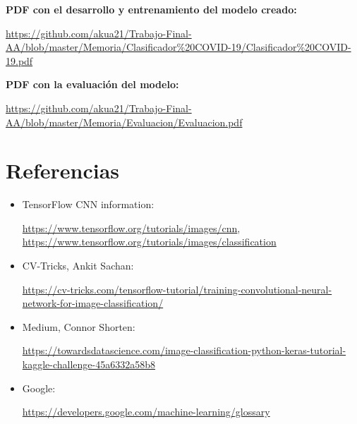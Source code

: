 \documentclass{uc3mpracticas}
\begin{document}
  \textbf{PDF con el desarrollo y entrenamiento del modelo creado: }

  \url{https://github.com/akua21/Trabajo-Final-AA/blob/master/Memoria/Clasificador%20COVID-19/Clasificador%20COVID-19.pdf}

  \textbf{PDF con la evaluación del modelo: }

  \url{https://github.com/akua21/Trabajo-Final-AA/blob/master/Memoria/Evaluacion/Evaluacion.pdf}

  \vspace{10mm}

  \section{Referencias}

  \begin{itemize}
    \item TensorFlow CNN information:

    \url{https://www.tensorflow.org/tutorials/images/cnn}, \url{https://www.tensorflow.org/tutorials/images/classification}

    \item CV-Tricks, Ankit Sachan:

    \url{https://cv-tricks.com/tensorflow-tutorial/training-convolutional-neural-network-for-image-classification/}

    \item Medium, Connor Shorten:

    \url{https://towardsdatascience.com/image-classification-python-keras-tutorial-kaggle-challenge-45a6332a58b8}

    \item Google:

    \url{https://developers.google.com/machine-learning/glossary}
  \end{itemize}
\end{document}
